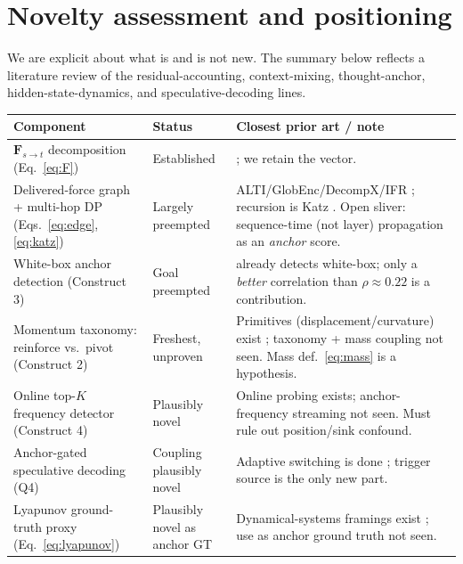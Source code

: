 \documentclass[11pt]{article}
\newcommand{\F}{\mathbf{F}}
\begin{document}
\section{Novelty assessment and positioning}

We are explicit about what is and is not new. The summary below reflects a literature review of the
residual-accounting, context-mixing, thought-anchor, hidden-state-dynamics, and speculative-decoding
lines.

\begin{table}[h]
\centering
\small
\begin{tabular}{@{}p{4.4cm}p{3.2cm}p{6.4cm}@{}}
\toprule
\textbf{Component} & \textbf{Status} & \textbf{Closest prior art / note} \\
\midrule
$\F_{s\to t}$ decomposition (Eq.~\ref{eq:F}) & Established &
\cite{kobayashi2021incorporating,ferrando2024information}; we retain the vector. \\
Delivered-force graph + multi-hop DP (Eqs.~\ref{eq:edge},\ref{eq:katz}) & Largely preempted &
ALTI/GlobEnc/DecompX/IFR \cite{ferrando2022measuring,modarressi2022globenc,modarressi2023decompx,ferrando2024information}; recursion is Katz \cite{katz1953new}. Open sliver: sequence-time (not layer) propagation as an \emph{anchor} score. \\
White-box anchor detection (Construct 3) & Goal preempted &
\cite{bogdan2025thought} already detects white-box; only a \emph{better} correlation than $\rho{\approx}0.22$ is a contribution. \\
Momentum taxonomy: reinforce vs.\ pivot (Construct 2) & Freshest, unproven &
Primitives (displacement/curvature) exist \cite{semstep2026,trajdyn2026,statphys2025}; taxonomy + mass coupling not seen. Mass def.\ \eqref{eq:mass} is a hypothesis. \\
Online top-$K$ frequency detector (Construct 4) & Plausibly novel &
Online probing exists; anchor-frequency streaming not seen. Must rule out position/sink confound. \\
Anchor-gated speculative decoding (Q4) & Coupling plausibly novel &
Adaptive switching is done \cite{liao2025reward}; trigger source is the only new part. \\
Lyapunov ground-truth proxy (Eq.~\ref{eq:lyapunov}) & Plausibly novel as anchor GT &
Dynamical-systems framings exist \cite{statphys2025}; use as anchor ground truth not seen. \\
\bottomrule
\end{tabular}
\end{table}
\end{document}
